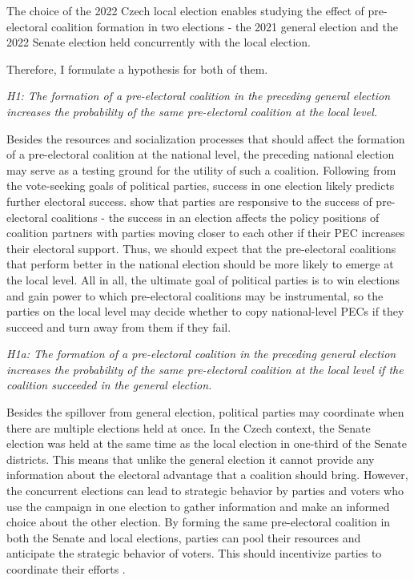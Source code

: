 \documentclass[]{interact}
\theoremstyle{plain}%
\theoremstyle{definition}
\theoremstyle{remark}
\begin{document}
The choice of the 2022 Czech local election enables studying the effect of pre-electoral coalition formation in two elections - the 2021 general election and the 2022 Senate election held concurrently with the local election. 

Therefore, I formulate a hypothesis for both of them.

\vspace{12pt}
\textit{H1: The formation of a pre-electoral coalition in the preceding general election increases the probability of the same pre-electoral coalition at the local level.\label{hyp:1}}
\vspace{12pt}

Besides the resources and socialization processes that should affect the formation of a pre-electoral coalition at the national level, the preceding national election may serve as a testing ground for the utility of such a coalition. Following from the vote-seeking goals of political parties, success in one election likely predicts further electoral success. \citet{greene2017} show that parties are responsive to the success of pre-electoral coalitions - the success in an election affects the policy positions of coalition partners with parties moving closer to each other if their PEC increases their electoral support. Thus, we should expect that the pre-electoral coalitions that perform better in the national election should be more likely to emerge at the local level. All in all, the ultimate goal of political parties is to win elections and gain power to which pre-electoral coalitions may be instrumental, so the parties on the local level may decide whether to copy national-level PECs if they succeed and turn away from them if they fail.  

\vspace{12pt}
\textit{H1a: The formation of a pre-electoral coalition in the preceding general election increases the probability of the same pre-electoral coalition at the local level if the coalition succeeded in the general election.\label{hyp:1.1}}
\vspace{12pt}

Besides the spillover from general election, political parties may coordinate when there are multiple elections held at once. In the Czech context, the Senate election was held at the same time as the local election in one-third of the Senate districts. This means that unlike the general election it cannot provide any information about the electoral advantage that a coalition should bring. However, the concurrent elections can lead to strategic behavior by parties and voters who use the campaign in one election to gather information and make an informed choice about the other election. By forming the same pre-electoral coalition in both the Senate and local elections, parties can pool their resources and anticipate the strategic behavior of voters. This should incentivize parties to coordinate their efforts \citep{hicken2011}. 
\end{document}
